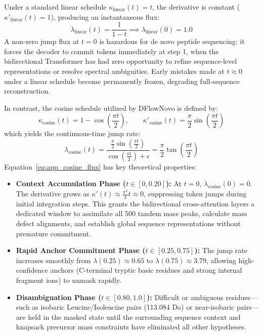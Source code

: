 Under a standard linear schedule $\kappa_{\text{linear}}(t) = t$, the derivative is constant ($\kappa'_{\text{linear}}(t) = 1$), producing an instantaneous flux:
\begin{equation}
\lambda_{\text{linear}}(t) = \frac{1}{1 - t} \implies \lambda_{\text{linear}}(0) = 1.0
\end{equation}
A non-zero jump flux at $t = 0$ is hazardous for de novo peptide sequencing: it forces the decoder to commit tokens immediately at step 1, when the bidirectional Transformer has had zero opportunity to refine sequence-level representations or resolve spectral ambiguities. Early mistakes made at $t \approx 0$ under a linear schedule become permanently frozen, degrading full-sequence reconstruction.

In contrast, the cosine schedule utilized by DFlowNovo is defined by:
\begin{equation}
\kappa_{\text{cosine}}(t) = 1 - \cos\left( \frac{\pi t}{2} \right), \qquad \kappa'_{\text{cosine}}(t) = \frac{\pi}{2} \sin\left( \frac{\pi t}{2} \right)
\end{equation}
which yields the continuous-time jump rate:
\begin{equation}
\lambda_{\text{cosine}}(t) = \frac{\frac{\pi}{2} \sin\left( \frac{\pi t}{2} \right)}{\cos\left( \frac{\pi t}{2} \right) + \epsilon} = \frac{\pi}{2} \tan\left( \frac{\pi t}{2} \right)
\label{eq:app_cosine_flux}
\end{equation}
Equation~\ref{eq:app_cosine_flux} has key theoretical properties:
\begin{itemize}
\item \textbf{Context Accumulation Phase ($t \in [0, 0.20]$):} At $t = 0$, $\lambda_{\text{cosine}}(0) = 0$. The derivative grows as $\kappa'(t) \approx \frac{\pi^2}{4} t \approx 0$, suppressing token jumps during initial integration steps. This grants the bidirectional cross-attention layers a dedicated window to assimilate all 500 tandem mass peaks, calculate mass defect alignments, and establish global sequence representations without premature commitment.
\item \textbf{Rapid Anchor Commitment Phase ($t \in [0.25, 0.75]$):} The jump rate increases smoothly from $\lambda(0.25) \approx 0.65$ to $\lambda(0.75) \approx 3.79$, allowing high-confidence anchors (C-terminal tryptic basic residues and strong internal fragment ions) to unmask rapidly.
\item \textbf{Disambiguation Phase ($t \in [0.80, 1.0]$):} Difficult or ambiguous residues—such as isobaric Leucine/Isoleucine pairs (113.084 Da) or near-isobaric pairs—are held in the masked state until the surrounding sequence context and knapsack precursor mass constraints have eliminated all other hypotheses.
\end{itemize}

